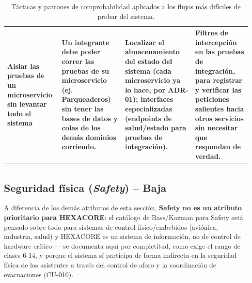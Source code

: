 \documentclass[12pt,a4paper]{article}
\begin{document}
\begin{center}
\begin{longtable}{p{2.6cm}p{4.7cm}p{3.6cm}p{2.9cm}}
Aislar las pruebas de un microservicio sin levantar todo el sistema &
Un integrante debe poder correr las pruebas de su microservicio (ej. Parqueaderos) sin tener
las bases de datos y colas de los demás dominios corriendo. &
Localizar el almacenamiento del estado del sistema (cada microservicio ya lo hace, por ADR-01);
interfaces especializadas (endpoints de salud/estado para pruebas de integración). &
\textbf{Filtros de intercepción} en las pruebas de integración, para registrar y verificar las
peticiones salientes hacia otros servicios sin necesitar que respondan de verdad.\\
\bottomrule
\caption{Tácticas y patrones de comprobabilidad aplicados a los flujos más difíciles de probar
del sistema.}
\label{tab:tacticas-testability}
\end{longtable}
\end{center}

\subsection{Seguridad física (\textit{Safety}) -- Baja}

A diferencia de los demás atributos de esta sección, \textbf{Safety no es un atributo prioritario
para HEXACORE}: el catálogo de Bass/Kazman para Safety está pensado sobre todo para sistemas de
control físico/embebidos (aviónica, industria, salud) y HEXACORE es un sistema de información, no
de control de hardware crítico — se documenta aquí por completitud, como exige el rango de clases
6-14, y porque el sistema sí participa de forma indirecta en la seguridad física de los asistentes
a través del control de aforo y la coordinación de evacuaciones (CU-010).
\end{document}

